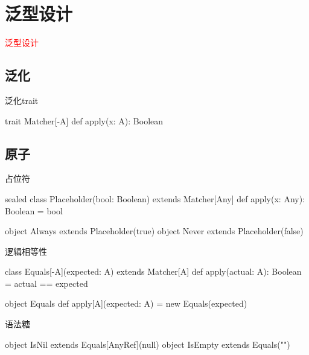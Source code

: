 \section{泛型设计}
\label{sec:generic-oo}

\begin{frame}
  \begin{center}
    \Huge{\textcolor{red}{泛型设计}}
  \end{center}
\end{frame}

\subsection{泛化}

\begin{frame}[fragile]{泛化trait}
  \begin{scala}
trait Matcher[-A] {
  def apply(x: A): Boolean
}
  \end{scala}
\end{frame}

\subsection{原子}

\begin{frame}[fragile]{占位符}
  \begin{scala}
sealed class Placeholder(bool: Boolean) extends Matcher[Any] {
  def apply(x: Any): Boolean = bool
}

object Always extends Placeholder(true)
object Never  extends Placeholder(false)
  \end{scala}
\end{frame}

\begin{frame}[fragile]{逻辑相等性}
  \begin{scala}
class Equals[-A](expected: A) extends Matcher[A] {
  def apply(actual: A): Boolean = actual == expected
}

object Equals {
  def apply[A](expected: A) = new Equals(expected)
}
  \end{scala}
\end{frame}

\begin{frame}[fragile]{语法糖}
  \begin{scala}
object IsNil extends Equals[AnyRef](null)
object IsEmpty extends Equals("")
  \end{scala}
\end{frame}

